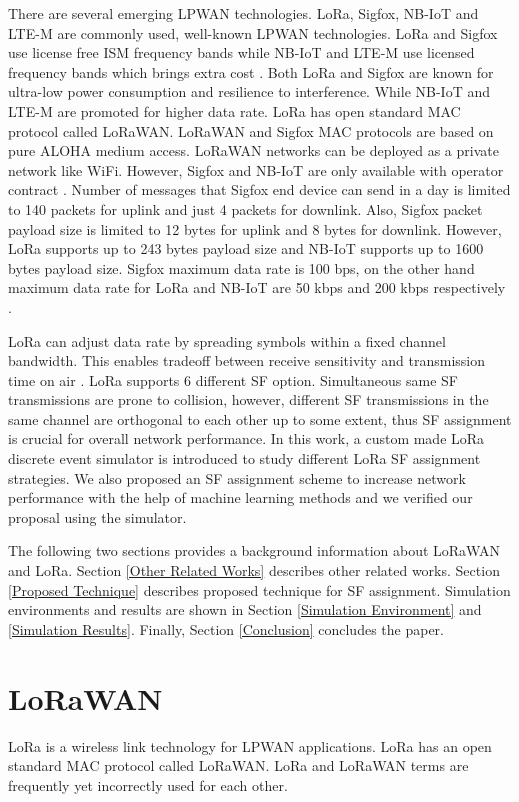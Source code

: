 \documentclass[conference]{IEEEtran}
\begin{document}
\par There are several emerging LPWAN technologies. LoRa, Sigfox, NB-IoT and LTE-M are commonly used, well-known LPWAN technologies. LoRa and Sigfox use license free ISM frequency bands while NB-IoT and LTE-M use licensed frequency bands which brings extra cost \cite{7815384}. Both LoRa and Sigfox are known for ultra-low power consumption and resilience to interference.  While NB-IoT and LTE-M are promoted for higher data rate. LoRa has open standard MAC protocol called LoRaWAN. LoRaWAN and Sigfox MAC protocols are based on pure ALOHA medium access. LoRaWAN networks can be deployed as a private network like WiFi. However, Sigfox and NB-IoT are only available with operator contract \cite{7815384}. Number of messages that Sigfox end device can send in a day is limited to 140 packets for uplink and just 4 packets for downlink. Also, Sigfox packet payload size is limited to 12 bytes for uplink and 8 bytes for downlink. However, LoRa supports up to 243 bytes payload size and NB-IoT supports up to 1600 bytes payload size. Sigfox maximum data rate is 100 bps, on the other hand maximum data rate for LoRa and NB-IoT are 50 kbps and 200 kbps respectively \cite{7815384}.

\par LoRa can adjust data rate by spreading symbols within a fixed channel bandwidth. This enables tradeoff between receive sensitivity and transmission time on air \cite{7803607}. LoRa supports 6 different SF option. Simultaneous same SF transmissions are prone to collision, however, different SF transmissions in the same channel are orthogonal to each other up to some extent, thus SF assignment is crucial for overall network performance. In this work, a custom made LoRa discrete event simulator is introduced to study different LoRa SF assignment strategies. We also proposed an SF assignment scheme to increase network performance with the help of machine learning methods and we verified our proposal using the simulator.

\par The following two sections provides a background information about LoRaWAN and LoRa. Section \ref{Other Related Works} describes other related works. Section \ref{Proposed Technique} describes proposed technique for SF assignment. Simulation environments and results are shown in Section \ref{Simulation Environment} and \ref{Simulation Results}. Finally, Section \ref{Conclusion} concludes the paper.


\section{LoRaWAN} \label{LoRaWAN}
\par LoRa is a wireless link technology for LPWAN applications. LoRa has an open standard MAC protocol called LoRaWAN. LoRa and LoRaWAN terms are frequently yet incorrectly used for each other.
\end{document}
